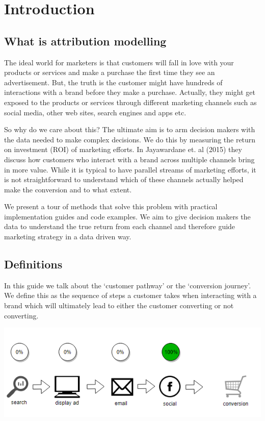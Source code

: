 \documentclass[]{book}
\begin{document}
\chapter{Introduction}\label{introduction}

\section{What is attribution
modelling}\label{what-is-attribution-modelling}

The ideal world for marketers is that customers will fall in love with
your products or services and make a purchase the first time they see an
advertisement. But, the truth is the customer might have hundreds of
interactions with a brand before they make a purchase. Actually, they
might get exposed to the products or services through different
marketing channels such as social media, other web sites, search engines
and apps etc.

So why do we care about this? The ultimate aim is to arm decision makers
with the data needed to make complex decisions. We do this by measuring
the return on investment (ROI) of marketing efforts. In Jayawardane et.
al (2015) they discuss how customers who interact with a brand across
multiple channels bring in more value. While it is typical to have
parallel streams of marketing efforts, it is not straightforward to
understand which of these channels actually helped make the conversion
and to what extent.

We present a tour of methods that solve this problem with practical
implementation guides and code examples. We aim to give decision makers
the data to understand the true return from each channel and therefore
guide marketing strategy in a data driven way.

\section{Definitions}\label{definitions}

In this guide we talk about the `customer pathway' or the `conversion
journey'. We define this as the sequence of steps a customer takes when
interacting with a brand which will ultimately lead to either the
customer converting or not converting.

\includegraphics[width=5.88in]{img/last_touch}
\end{document}
